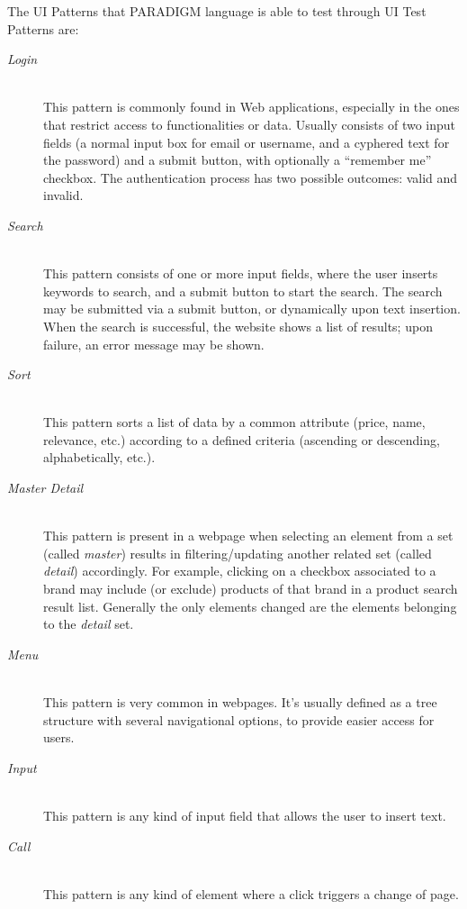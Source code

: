 \documentclass[conference]{IEEEtran}
\begin{document}
The UI Patterns that PARADIGM language is able to test through UI Test Patterns are:
\begin{description}
\item[\textit{Login}] \hfill \\
This pattern is commonly found in Web applications, especially in the ones that restrict access to functionalities or data. Usually consists of two input fields (a normal input box for email or username, and a cyphered text for the password) and a submit button, with optionally a ``remember me'' checkbox. The authentication process has two possible outcomes: valid and invalid.
\item[\textit{Search}] \hfill \\
This pattern consists of one or more input fields, where the user inserts keywords to search, and a submit button to start the search. The search may be submitted via a submit button, or dynamically upon text insertion. When the search is successful, the website shows a list of results; upon failure, an error message may be shown.
\item[\textit{Sort}] \hfill \\
This pattern sorts a list of data by a common attribute (price, name, relevance, etc.) according to a defined criteria (ascending or descending, alphabetically, etc.).
\item[\textit{Master Detail}] \hfill \\
This pattern is present in a webpage when selecting an element from a set (called \textit{master}) results in filtering/updating another related set (called \textit{detail}) accordingly. For example, clicking on a checkbox associated to a brand may include (or exclude) products of that brand in a product search result list. Generally the only elements changed are the elements belonging to the \textit{detail} set.
\item[\textit{Menu}] \hfill \\
This pattern is very common in webpages. It's usually defined as a tree structure with several navigational options, to provide easier access for users. 
\item[\textit{Input}] \hfill \\
This pattern is any kind of input field that allows the user to insert text.
\item[\textit{Call}] \hfill \\
This pattern is any kind of element where a click triggers a change of page.
\end{description}
\end{document}
